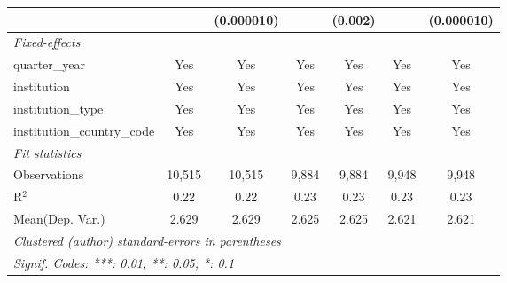 \begin{tabular}{lcccccc}
                                      &              & (0.000010) &              & (0.002)  &              & (0.000010)\\   
   \midrule
   \emph{Fixed-effects}\\
   quarter\_year                      & Yes          & Yes        & Yes          & Yes      & Yes          & Yes\\  
   institution                        & Yes          & Yes        & Yes          & Yes      & Yes          & Yes\\  
   institution\_type                  & Yes          & Yes        & Yes          & Yes      & Yes          & Yes\\  
   institution\_country\_code         & Yes          & Yes        & Yes          & Yes      & Yes          & Yes\\  
   \midrule
   \emph{Fit statistics}\\
   Observations                       & 10,515       & 10,515     & 9,884        & 9,884    & 9,948        & 9,948\\  
   R$^2$                              & 0.22         & 0.22       & 0.23         & 0.23     & 0.23         & 0.23\\  
Mean(Dep. Var.) & 2.629 & 2.629 & 2.625 & 2.625 & 2.621 & 2.621 \\
   \midrule \midrule
   \multicolumn{7}{l}{\emph{Clustered (author) standard-errors in parentheses}}\\
   \multicolumn{7}{l}{\emph{Signif. Codes: ***: 0.01, **: 0.05, *: 0.1}}\\
\end{tabular}
\par\endgroup
